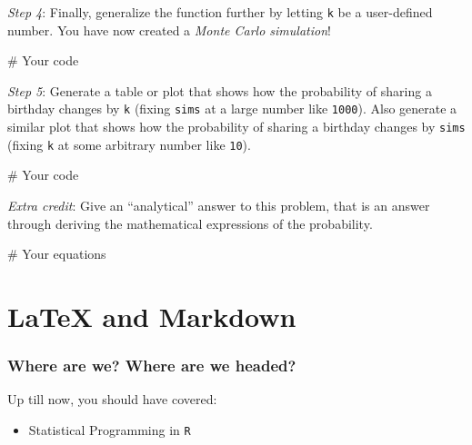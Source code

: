 \documentclass[
  letterpaper,
]{book}
\newenvironment{Shaded}{\begin{snugshade}}{\end{snugshade}}
\newcommand{\CommentTok}[1]{\textcolor[rgb]{0.37,0.37,0.37}{#1}}
\providecommand{\tightlist}{%
  \setlength{\itemsep}{0pt}\setlength{\parskip}{0pt}}\usepackage{longtable,booktabs,array}
\theoremstyle{definition}
\theoremstyle{definition}
\theoremstyle{plain}
\theoremstyle{definition}
\theoremstyle{plain}
\theoremstyle{plain}
\theoremstyle{remark}
\begin{document}
\emph{Step 4}: Finally, generalize the function further by letting
\texttt{k} be a user-defined number. You have now created a \emph{Monte
Carlo simulation}!

\begin{Shaded}
\begin{Highlighting}[]
\CommentTok{\# Your code}
\end{Highlighting}
\end{Shaded}

\emph{Step 5}: Generate a table or plot that shows how the probability
of sharing a birthday changes by \texttt{k} (fixing \texttt{sims} at a
large number like \texttt{1000}). Also generate a similar plot that
shows how the probability of sharing a birthday changes by \texttt{sims}
(fixing \texttt{k} at some arbitrary number like \texttt{10}).

\begin{Shaded}
\begin{Highlighting}[]
\CommentTok{\# Your code}
\end{Highlighting}
\end{Shaded}

\emph{Extra credit}: Give an ``analytical'' answer to this problem, that
is an answer through deriving the mathematical expressions of the
probability.

\begin{Shaded}
\begin{Highlighting}[]
\CommentTok{\# Your equations}
\end{Highlighting}
\end{Shaded}

\hypertarget{nonwysiwyg}{%
\chapter{LaTeX and Markdown}\label{nonwysiwyg}}

\hypertarget{where-are-we-where-are-we-headed-2}{%
\subsection*{Where are we? Where are we
headed?}\label{where-are-we-where-are-we-headed-2}}

Up till now, you should have covered:

\begin{itemize}
\tightlist
\item
  Statistical Programming in \texttt{R}
\end{itemize}
\end{document}
